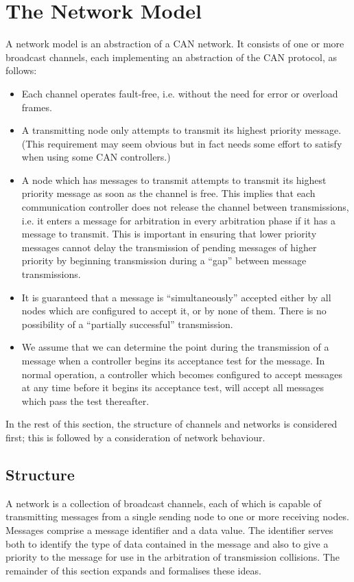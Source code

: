 \section{The Network Model \label{sec:bcnetwork}}
A network model is an abstraction of a CAN network. It consists
of one or more broadcast channels, each implementing an abstraction of
the CAN protocol, as follows: 

\begin{itemize}
\item Each channel operates fault-free, i.e. without the need for error or
  overload frames.
\item A transmitting node only attempts to transmit its highest priority
message. (This requirement may seem obvious but in fact needs some
effort to satisfy when using some CAN controllers.) 
\item A node which has messages to transmit attempts to transmit its
highest priority message as soon as the channel is free. This implies
that each communication controller does not release the channel between
transmissions, i.e.  it enters a message for arbitration in every
arbitration phase if it has a message to transmit. This is important in
ensuring that lower priority messages cannot delay the transmission of
pending messages of higher priority by beginning transmission during a
``gap'' between message transmissions.
\item It is guaranteed that a message is ``simultaneously''
  accepted either by all nodes which are configured to accept it,
  or by none of them. There is no possibility of
  a ``partially successful'' transmission.
\item We assume that we can determine the point during the transmission
  of a message when a controller begins its acceptance test for the message.
  In normal operation, a controller which becomes configured to accept 
  messages  at any time before it begins its acceptance test, will accept all 
  messages which pass the test thereafter.
\end{itemize}

In the rest of this section, the structure of
channels and networks is considered first; this is followed by a 
consideration of network behaviour. 

\subsection{Structure}\label{ss:bcnetstructure}
A network is a collection of broadcast channels, each of which is capable of
transmitting messages from a single sending node to one or more
receiving nodes. Messages comprise a message identifier and a
data value. The identifier serves both to identify the type of
data contained in the message and also to give a priority to the
message for use in the arbitration of transmission collisions. The
remainder of this section expands and formalises these ideas.
